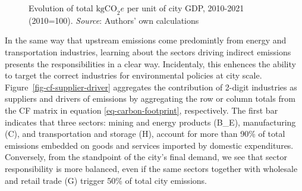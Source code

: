 \documentclass[
  10pt,
  twocolumn]{aft}
\begin{document}
\begin{figure}


\caption{\label{fig-cf-growth-factors}Evolution of total
\(\text{kgCO}_2e\) per unit of city GDP, 2010-2021 (2010=100).
\emph{Source}: Authors' own calculations}

\end{figure}%

In the same way that upstream emissions come predomintly from energy and
transportation industries, learning about the sectors driving indirect
emissions presents the responsibilities in a clear way. Incidentaly,
this enhences the ability to target the correct industries for
environmental policies at city scale.
Figure~\ref{fig-cf-supplier-driver} aggregates the contribution of
2-digit industries as suppliers and drivers of emissions by aggregating
the row or column totals from the CF matrix in equation
\ref{eq-carbon-footprint}, respectively. The first bar indicates that
three sectors: mining and energy products (B\_E), manufacturing (C), and
transportation and storage (H), account for more than 90\% of total
emissions embedded on goods and services imported by domestic
expenditures. Conversely, from the standpoint of the city's final
demand, we see that sector responsibility is more balanced, even if the
same sectors together with wholesale and retail trade (G) trigger 50\%
of total city emissions.
\end{document}

